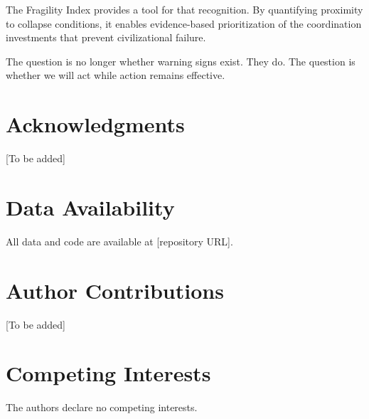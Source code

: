 \documentclass[11pt,a4paper]{article}
\begin{document}
The Fragility Index provides a tool for that recognition. By quantifying proximity to collapse conditions, it enables evidence-based prioritization of the coordination investments that prevent civilizational failure.

The question is no longer whether warning signs exist. They do. The question is whether we will act while action remains effective.

\section*{Acknowledgments}
[To be added]

\section*{Data Availability}
All data and code are available at [repository URL].

\section*{Author Contributions}
[To be added]

\section*{Competing Interests}
The authors declare no competing interests.



\end{document}
